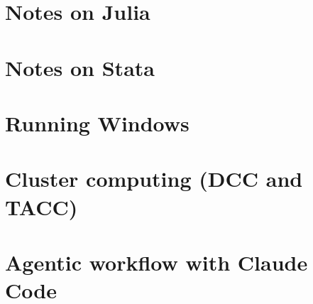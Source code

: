 \documentclass{report}
\numberwithin{equation}{section}
\numberwithin{figure}{section}
\numberwithin{table}{section}
\begin{document}
\section{Notes on Julia} 
\section{Notes on Stata} 
\section{Running Windows} 
\section{Cluster computing (DCC and TACC)} \label{entry:clustercomputing} 
\section{Agentic workflow with Claude Code} \label{entry:agenticworkflow} 


%
\end{document}
